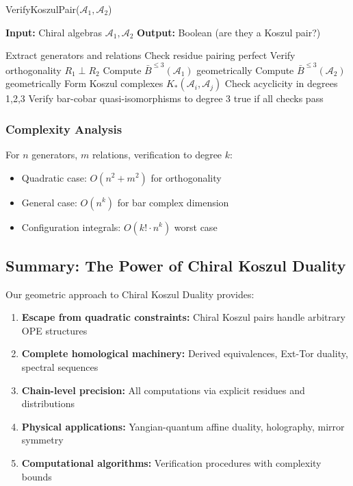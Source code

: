 \begin{algorithm}
\caption{VerifyKoszulPair($\mathcal{A}_1, \mathcal{A}_2$)}
\begin{algorithmic}
\STATE \textbf{Input:} Chiral algebras $\mathcal{A}_1, \mathcal{A}_2$
\STATE \textbf{Output:} Boolean (are they a Koszul pair?)

    \STATE Extract generators and relations
    \STATE Check residue pairing perfect
    \STATE Verify orthogonality $R_1 \perp R_2$
\ELSE
    \STATE Compute $\bar{B}^{\leq 3}(\mathcal{A}_1)$ geometrically
    \STATE Compute $\bar{B}^{\leq 3}(\mathcal{A}_2)$ geometrically
    \STATE Form Koszul complexes $K_*(\mathcal{A}_i, \mathcal{A}_j)$
    \STATE Check acyclicity in degrees 1,2,3
\ENDIF
\STATE Verify bar-cobar quasi-isomorphisms to degree 3
\RETURN true if all checks pass
\end{algorithmic}
\end{algorithm}

\subsubsection{Complexity Analysis}

For $n$ generators, $m$ relations, verification to degree $k$:
\begin{itemize}
\item Quadratic case: $O(n^2 + m^2)$ for orthogonality
\item General case: $O(n^k)$ for bar complex dimension
\item Configuration integrals: $O(k! \cdot n^k)$ worst case
\end{itemize}


\subsection{Summary: The Power of Chiral Koszul Duality}

Our geometric approach to Chiral Koszul Duality provides:

\begin{enumerate}
\item \textbf{Escape from quadratic constraints:} Chiral Koszul pairs handle arbitrary OPE structures

\item \textbf{Complete homological machinery:} Derived equivalences, Ext-Tor duality, spectral sequences

\item \textbf{Chain-level precision:} All computations via explicit residues and distributions

\item \textbf{Physical applications:} Yangian-quantum affine duality, holography, mirror symmetry

\item \textbf{Computational algorithms:} Verification procedures with complexity bounds
\end{enumerate}


